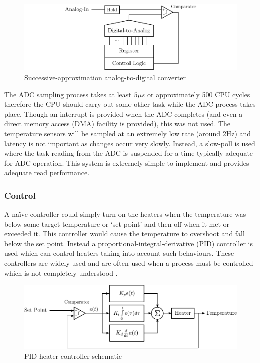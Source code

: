 				\begin{figure}
					\includegraphics[width=1\textwidth]{diagrams/adc.pdf}
					\caption{Successive-approximation analog-to-digital converter}
					\label{fig:adc}
				\end{figure}
				
				The ADC sampling process takes at least $5\mu{}s$ or approximately 500
				CPU cycles \cite{lpc1768} therefore the CPU should carry out some other
				task while the ADC process takes place. Though an interrupt is provided
				when the ADC completes (and even a direct memory access (DMA) facility
				is provided), this was not used. The temperature sensors will be sampled
				at an extremely low rate (around 2Hz) and latency is not important as
				changes occur very slowly. Instead, a slow-poll is used where the task
				reading from the ADC is suspended for a time typically adequate for ADC
				operation. This system is extremely simple to implement and provides
				adequate read performance.
			
			\subsubsection{Control}
				
				A na\"{i}ve controller could simply turn on the heaters when the
				temperature was below some target temperature or `set point' and then
				off when it met or exceeded it. This controller would cause the
				temperature to overshoot and fall below the set point. Instead a
				proportional-integral-derivative (PID) controller is used which can
				control heaters taking into account such behaviours. These controllers
				are widely used and are often used when a process must be controlled
				which is not completely understood \cite{controleng}.
				
				\begin{figure}
					\includegraphics[width=1\textwidth]{diagrams/pid.pdf}
					\caption{PID heater controller schematic}
					\label{fig:pid}
				\end{figure}
				
